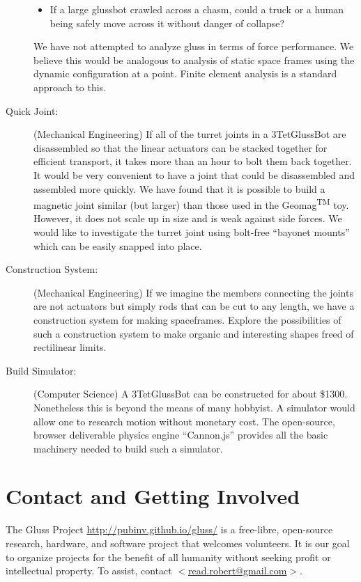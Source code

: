 \documentclass[11pt]{article}
\begin{document}
\begin{description}
\begin{itemize}
\item If a large glussbot crawled across a chasm, could a truck or a human being safely move
  across it without danger of collapse?
\end{itemize}
We have not attempted to analyze gluss in terms of force performance. We believe this would
be analogous to analysis of static space frames using the dynamic configuration at a point.
Finite element analysis is a standard approach to this.
\item [Quick Joint:] (Mechanical Engineering) If all of the turret joints in a 3TetGlussBot are disassembled so that
  the linear actuators can be stacked together for efficient transport, it takes more than an hour
  to bolt them back together. It would be very convenient to have a joint that could be
  disassembled and assembled more quickly. We have found that it is possible to build a magnetic
  joint similar (but larger) than those used in the Geomag\textsuperscript{TM} toy. However, it does not scale up in size
  and is weak against side forces. We would like to investigate the turret joint using bolt-free ``bayonet mounts'' which
  can be easily snapped into place.
\item [Construction System:] (Mechanical Engineering) If we imagine the members connecting the joints are not actuators but
  simply rods that can be cut to any length, we have a construction system for making spaceframes.
  Explore the possibilities of such a construction system to make organic and interesting shapes
  freed of rectilinear limits.
\item [Build Simulator:] (Computer Science) A 3TetGlussBot can be constructed for about \$1300. Nonetheless this
  is beyond the means of many hobbyist. A simulator would allow one to research 
  motion without monetary cost. The open-source, browser deliverable physics engine ``Cannon.js''
  provides all the basic machinery needed to build such a simulator.
\end{description}


\section{Contact and Getting Involved}

The Gluss Project \href{http://pubinv.github.io/gluss/}{http://pubinv.github.io/gluss/}
is a free-libre, open-source research, hardware, and software project that welcomes volunteers.
It is our goal to organize projects for the benefit of all humanity without seeking profit or intellectual property.
To assist, contact \href{mailto:read.robert@gmail.com}{$<$read.robert@gmail.com$>$}.
\end{document}
